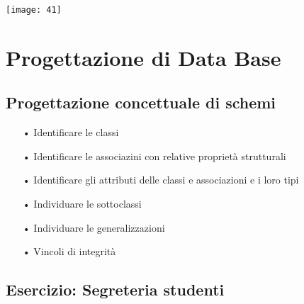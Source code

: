 \documentclass[12pt, letterpaper]{article}
\begin{document}
\texttt{[image: 41]}

\section{Progettazione di Data Base}

\subsection{Progettazione concettuale di schemi}

\begin{itemize}
   \item[•] Identificare le classi 
   \item[•] Identificare le associazini con relative proprietà strutturali 
   \item[•] Identificare gli attributi delle classi e associazioni e i loro tipi 
   \item[•] Individuare le sottoclassi 
   \item[•] Individuare le generalizzazioni 
   \item[•] Vincoli di integrità
\end{itemize}

\subsection{Esercizio: Segreteria studenti}
\end{document}
